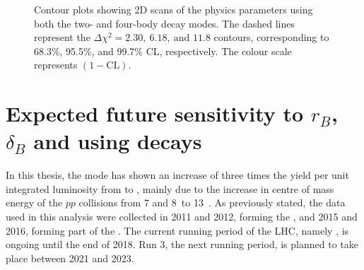 \begin{figure}[h]
\centering
{}
\caption{Contour plots showing 2D scans of the physics parameters using both the two- and four-body \Dz decay modes. The dashed lines represent the $\Delta \chi^2 = 2.30,\ 6.18,\ \text{and } 11.8$ contours, corresponding to 68.3\%, 95.5\%, and 99.7\% CL, respectively. The colour scale represents $(1 - \text{CL})$.}
\label{gammadiniplotsallmodes}
\end{figure}

\section{Expected future sensitivity to $r_B$, $\delta_B$ and \Pgamma using \btodkst decays}
\label{sec:interpretation:futuresensitivity}

In this thesis, the \btodkst mode has shown an increase of three times the yield per unit integrated luminosity from \runone to \runtwo, mainly due to the increase in centre of mass energy of the $pp$ collisions from 7 and 8~\tev to 13~\tev. As previously stated, the data used in this analysis were collected in 2011 and 2012, forming the \runone \dataset, and 2015 and 2016, forming part of the \runtwo \dataset. The current running period of the LHC, namely \runtwo, is ongoing until the end of 2018. Run 3, the next running period, is planned to take place between 2021 and 2023.

